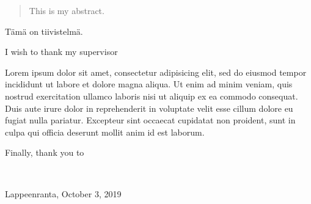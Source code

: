 \maketitle
\newpage

\begin{abstract}
    This is my abstract.
\end{abstract}

\begin{tiivistelma}
    Tämä on tiivistelmä.
\end{tiivistelma}

\begin{preface}
    I wish to thank my supervisor
    
    Lorem ipsum dolor sit amet, consectetur adipisicing elit, sed do eiusmod
    tempor incididunt ut labore et dolore magna aliqua. Ut enim ad minim veniam,
    quis nostrud exercitation ullamco laboris nisi ut aliquip ex ea commodo
    consequat. Duis aute irure dolor in reprehenderit in voluptate velit esse
    cillum dolore eu fugiat nulla pariatur. Excepteur sint occaecat cupidatat non
    proident, sunt in culpa qui officia deserunt mollit anim id est laborum.
    
    Finally, thank you to
    
    
    
    \
    
    Lappeenranta, October 3, 2019
\end{preface}

\renewcommand\refname{REFERENCES}
\renewcommand\contentsname{CONTENTS}

\pagestyle{masters}
\newpage